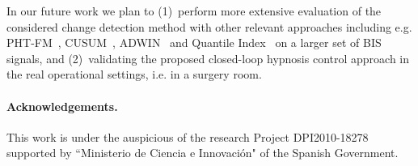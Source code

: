 In our future work we plan to (1)~perform more extensive evaluation of
the considered change detection method with other relevant approaches
including e.g. PHT-FM~\cite{GamaRealTimeAlg}, CUSUM~\cite{Cusum}, ADWIN~\cite{adwin07} and Quantile Index~\cite{Maslov_QI} on a larger set of BIS signals, and 
(2)~validating the proposed closed-loop hypnosis control approach in
the real operational settings, i.e. in a surgery room.
%
%
%

\paragraph{Acknowledgements.}
This work is under the auspicious of the research Project
DPI2010-18278 supported by ``Ministerio de Ciencia e Innovación" of the
Spanish Government.


%
%


